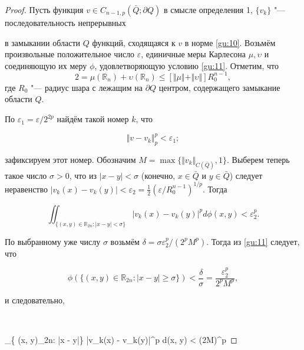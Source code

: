 \begin{proof} Пусть функция $v \in C_{n-1,p}(\bar {Q} ; \partial Q)$ в смысле определения 1, $\{ v_k\}$ "--- последовательность непрерывных

в замыкании области $Q$ функций, сходящаяся к $v$ в норме \eqref{gu:10}. Возьмём произвольные положительное число $\varepsilon$, единичные меры Карлесона $\mu , \upsilon$ и соединяющую их меру $\phi$, удовлетворяющую условию \eqref{gu:11}. Отметим, что $$2 = \mu ({\mathbb R}_n) + \upsilon ({\mathbb R}_n) \leq [\Vert\mu\Vert + \Vert\upsilon\Vert ]R_0^{n-1},$$ где $R_0$ "--- радиус шара с лежащим на $\partial Q$ центром, содержащего замыкание области $Q$.



По $\varepsilon_1 = {\varepsilon}/{2^{2p}}$ найдём такой номер $k$, что 

\begin{equation}

\Vert v - v_k\Vert_p^p < \varepsilon_1; 

\label{gu:13}

\end{equation}

зафиксируем этот номер. Обозначим $M = \max\{\Vert v_k\Vert_{C(\bar {Q})},

1\}$. Выберем теперь такое число $\sigma > 0$, что из $|x - y| < \sigma$ (конечно, $x \in \bar {Q}$ и $y \in \bar {Q}$) следует неравенство $|v_k(x) - v_k(y)| < \varepsilon_2 = \frac{1}{2} \left({\varepsilon}/{R_0^{n-1}} \right)^{1/p}$. Тогда

\begin{equation}

\iint_{\{ (x, y)\in{\mathbb R}_{2n}: |x - y|< \sigma\}} |v_k(x) - v_k(y)|^p d\phi (x, y) < \varepsilon_2^p. 

\label{gu:14}

\end{equation}

По выбранному уже числу $\sigma$ возьмём $\delta = {\sigma \varepsilon_2^p}/({2^{p} M^p})$. Тогда из \eqref{gu:11} следует, что

$$

\phi (\{ (x, y)\in{\mathbb R}_{2n}: |x - y| \geq \sigma\}) < \frac \delta \sigma = \frac{\varepsilon_2^p}{2^{p} M^p},

$$

и следовательно, 

$$

\iint_{\{ (x, y)_{2n}: |x - y|\geq\sigma\}} |v_k(x) - v_k(y)|^p d\phi (x, y) < (2M)^p


\end{proof}
